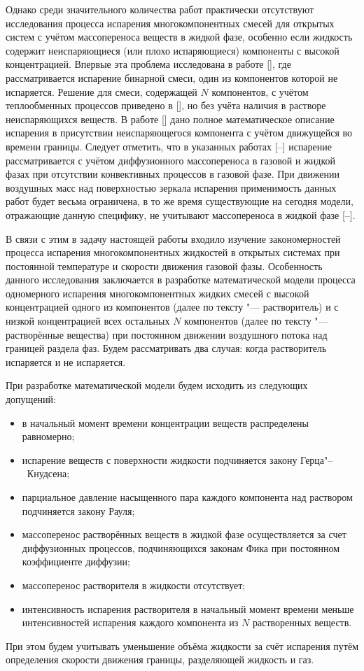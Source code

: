 Однако среди значительного количества работ практически отсутствуют исследования процесса испарения многокомпонентных смесей для открытых систем с учётом массопереноса веществ в жидкой фазе, особенно если жидкость содержит неиспаряющиеся (или плохо испаряющиеся) компоненты с высокой концентрацией. Впервые эта проблема исследована в работе [], где рассматривается испарение бинарной смеси, один из компонентов которой не испаряется. 
Решение для смеси, содержащей $N$ компонентов, с учётом теплообменных процессов приведено в  [], но без учёта наличия в растворе неиспаряющихся веществ. 
В работе [] дано полное математическое описание испарения в присутствии неиспаряющегося компонента с учётом движущейся во времени границы. Следует отметить, что в указанных работах [--] испарение рассматривается с учётом диффузионного массопереноса в газовой и жидкой фазах при отсутствии конвективных процессов в газовой фазе. При движении воздушных масс над поверхностью зеркала испарения применимость данных работ будет весьма ограничена, в то же время существующие на сегодня модели, отражающие данную специфику, не учитывают массопереноса в жидкой фазе [--].

В связи с этим в задачу настоящей работы входило изучение закономерностей процесса испарения многокомпонентных жидкостей в открытых системах при постоянной температуре и скорости движения газовой фазы. 
Особенность данного исследования заключается в разработке математической модели процесса одномерного испарения многокомпонентных жидких смесей с высокой концентрацией одного из компонентов (далее по тексту "--- растворитель) и с низкой концентрацией всех остальных $N$ компонентов (далее по тексту "--- растворённые вещества) при постоянном движении воздушного потока над границей раздела фаз. 
Будем рассматривать два случая: когда растворитель испаряется и не испаряется.

При разработке математической модели будем исходить из следующих допущений: 
\begin{itemize}
\item
в начальный момент времени концентрации веществ распределены равномерно; 
\item
испарение веществ с поверхности жидкости подчиняется закону Герца"--~Кнудсена; 
\item
парциальное давление насыщенного пара каждого компонента над раствором подчиняется закону Рауля; 
\item
массоперенос растворённых веществ в жидкой фазе осуществляется за счет диффузионных процессов, подчиняющихся законам Фика при постоянном коэффициенте диффузии; 
\item
массоперенос растворителя в жидкости отсутствует; 
\item
интенсивность испарения растворителя в начальный момент времени меньше интенсивностей испарения каждого компонента из $N$ растворенных веществ. 

\end{itemize}
При этом будем учитывать уменьшение объёма жидкости за счёт испарения путём определения скорости движения границы, разделяющей жидкость и газ.

